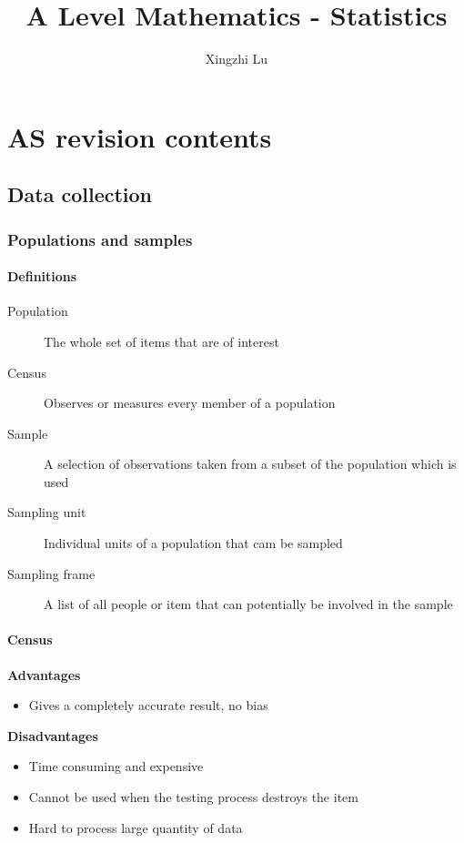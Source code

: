 \documentclass[oneside,fleqn,11pt]{book}
\title{A Level Mathematics - Statistics}
\author{Xingzhi Lu}
\date{}
\begin{document}
	\maketitle
	
	\part{AS revision contents}
	
	
	\chapter{Data collection}
	\section{Populations and samples}
	\subsection{Definitions}
	\begin{description}
		\item[Population] The whole set of items that are of interest
		\item[Census] Observes or measures every member of a population
		\item[Sample] A selection of observations taken from a subset of the population which is used
		\item[Sampling unit] Individual units of a population that cam be sampled
		\item[Sampling frame] A list of all people or item that can potentially be involved in the sample
	\end{description}
	
	\subsection{Census}
	\textbf{Advantages}
	\begin{itemize}
		\item Gives a completely accurate result, no bias
	\end{itemize}
	\textbf{Disadvantages}
	\begin{itemize}
		\item Time consuming and expensive
		\item Cannot be used when the testing process destroys the item
		\item Hard to process large quantity of data
	\end{itemize}
\end{document}
